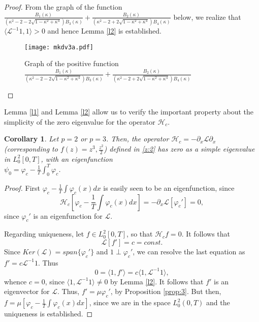 \documentclass[final,11pt,leqno]{amsart}
\newtheorem{corollary}{Corollary}
\begin{document}
\begin{proof}
 From the graph of the function ${\frac{B_1(\kappa)}{(\kappa^2-2-2\sqrt{1-\kappa^2+\kappa^4})B_3(\kappa)}}+
  {\frac{B_2(\kappa)}{(\kappa^2-2+2\sqrt{1-\kappa^2+\kappa^4})B_4(\kappa)}}$ below, we realize that ${\langle {{\mathcal L}^{-1} 1},{1} \rangle}>0$ and hence Lemma \ref{l2} is established.
    \begin{figure}[h8]
\centering
\texttt{[image: mkdv3a.pdf]}
\caption{Graph of the positive function ${\frac{B_1(\kappa)}{(\kappa^2-2-2\sqrt{1-\kappa^2+\kappa^4})B_3(\kappa)}}+
  {\frac{B_2(\kappa)}{(\kappa^2-2+2\sqrt{1-\kappa^2+\kappa^4})B_4(\kappa)}}$}
\label{fig8}
\end{figure}
\end{proof}

\pagebreak
Lemma \ref{l1} and Lemma \ref{l2} allow us to verify the important property about the simplicity of the zero eigenvalue for the operator ${\mathcal H}_c$.
\begin{corollary}
\label{cor:p}
Let $p=2$ or $p=3$. Then, the operator ${\mathcal H}_c=-{\partial}_x {\mathcal L}{\partial}_x $ (corresponding to $f(z)=z^3, {\frac{{z^2}}{{2}}}$) defined in \eqref{z:2}
has zero as a simple eigenvalue in $L^2_0[0,T]$, with an eigenfunction \\  $\psi_0={\varphi}_c-{\frac{{1}}{{T}}}\int_0^T {\varphi}_c$.
\end{corollary}
\begin{proof}
First ${\varphi}_c-{\frac{{1}}{{T}}}\int {\varphi}_c(x) dx$ is easily seen to be an eigenfunction, since
$$
{\mathcal H}_c[{\varphi}_c-{\frac{{1}}{{T}}}\int {\varphi}_c(x) dx]=-{\partial}_x {\mathcal L}[{\varphi}_c']=0,
$$ since ${\varphi}_c'$ is an eigenfunction for ${\mathcal L}$.

Regarding uniqueness, let $f\in L^2_0[0,T]$, so that ${\mathcal H}_c f=0$. It follows that
$$
{\mathcal L}[f']=c=const.
$$
Since $Ker({\mathcal L})=span \{{\varphi}_c'\}$ and $1\perp {\varphi}_c'$, we can resolve the last equation as $f'=c {\mathcal L}^{-1} 1$. Thus
$$
0={\langle {1},{f'} \rangle}=c{\langle {1},{{\mathcal L}^{-1} 1} \rangle},
$$
whence $c=0$, since ${\langle {1},{{\mathcal L}^{-1} 1} \rangle}\neq 0$ by Lemma \ref{l2}. It follows that $f'$ is an eigenvector for ${\mathcal L}$. Thus,
$f'=\mu {\varphi}_c'$, by Proposition \ref{prop:3}. But then,
$f=\mu[{\varphi}_c-{\frac{{1}}{{T}}}\int {\varphi}_c(x) dx]$, since we are in the space $L^2_0(0,T)$ and the uniqueness is established.
\end{proof}
\end{document}
